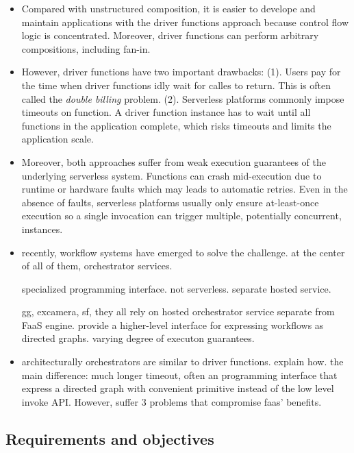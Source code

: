 \begin{itemize}
	\item Compared with unstructured composition, it is easier to develope and
	maintain applications with the driver functions approach because control
	flow logic is concentrated. Moreover, driver functions can perform
	arbitrary compositions, including fan-in.

	\item However, driver functions have two important drawbacks: (1). Users
	pay for the time when driver functions idly wait for calles to return.
	This is often called the \emph{double billing} problem. (2). Serverless
	platforms commonly impose timeouts on function. A driver function instance
	has to wait until all functions in the application complete, which risks
	timeouts and limits the application scale.

	\item Moreover, both approaches suffer from weak execution guarantees of
	the underlying serverless system. Functions can crash mid-execution due to
	runtime or hardware faults which may leads to automatic retries. Even in
	the absence of faults, serverless platforms usually only ensure
	at-least-once execution so a single invocation can trigger multiple,
	potentially concurrent, instances.

	\item recently, workflow systems have emerged to solve the challenge.
	at the center of all of them, orchestrator services.

	specialized programming interface.
	not serverless. separate hosted service.

	gg, excamera, sf, they all rely on hosted
	orchestrator service separate from FaaS engine. provide a higher-level
	interface for expressing workflows as directed graphs. varying degree of
	executon guarantees.

	\item architecturally orchestrators are similar to driver functions.
	explain how. the main difference: much longer timeout, often an
	programming interface that express a directed graph with convenient
	primitive instead of the low level invoke API.
	However, suffer 3 problems that compromise faas' benefits.

\end{itemize}


\subsection{Requirements and objectives}

